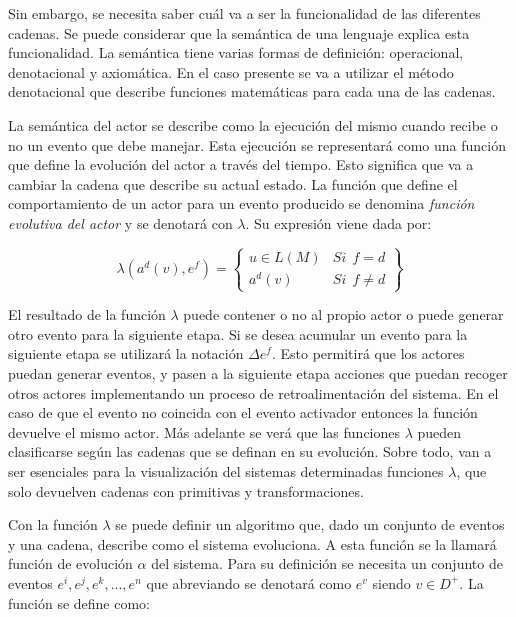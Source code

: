 \documentclass{egpubl}
\begin{document}
Sin embargo, se necesita saber cu\'al va a ser
la funcionalidad de las diferentes cadenas. Se puede considerar que la
sem\'antica de una lenguaje explica esta funcionalidad. La sem\'antica
tiene varias formas de definici\'on: operacional, denotacional y
axiom\'atica. En el caso presente se va
a utilizar el m\'etodo denotacional que
describe funciones matem\'aticas para cada una de las cadenas.

La sem\'antica del actor se describe como la
ejecuci\'on del mismo cuando recibe o no un evento que debe manejar.
Esta ejecuci\'on se representar\'a como una funci\'on que define la
evoluci\'on del actor a trav\'es del tiempo. Esto significa que va a
cambiar la cadena que describe su actual estado. La funci\'on que
define el comportamiento de un actor para un evento producido se
denomina \textit{funci\'on evolutiva del
actor} y se denotar\'a con $\lambda$. Su expresi\'on viene dada por:

\begin{equation}
 	\lambda (a^{d}(v),e^{f})=
	\left\{
	\begin{array}{ll}
		u \in L(M) & \mathit{Si}  \ \ f = d \\
		a^{d}(v)  & \mathit{Si}  \ \ f \neq d 
	\end{array}\right\}
\end{equation}

El resultado de la funci\'on $\lambda$ puede
contener o no al propio actor o puede generar otro evento para la
siguiente etapa. Si se desea acumular un
evento para la siguiente etapa se utilizar\'a la notaci\'on
$\Delta e^{f}$.
Esto permitir\'a que los actores puedan generar eventos, y pasen a la
siguiente etapa acciones que puedan recoger otros actores implementando
un proceso de retroalimentaci\'on del sistema. En el caso de que el
evento no coincida con el evento activador entonces la funci\'on
devuelve el mismo actor. M\'as adelante se ver\'a que las funciones
$\lambda$ pueden clasificarse seg\'un las cadenas que se definan en
su evoluci\'on. Sobre todo, van a ser esenciales para la
visualizaci\'on del sistemas determinadas funciones $\lambda$, que
solo devuelven cadenas con primitivas y transformaciones.

Con la funci\'on $\lambda$ se puede definir un algoritmo que, dado un
conjunto de eventos y una cadena, describe como el sistema evoluciona.
A esta funci\'on se la llamar\'a funci\'on de evoluci\'on $\alpha$
del sistema. Para su definici\'on se necesita un conjunto de eventos
$e^{i}, e^{j}, e^{k}, ..., e^{n}$ que abreviando se
denotar\'a como $e^{v}$ siendo
$v \in D^{+}$. La funci\'on se define como:
\end{document}
